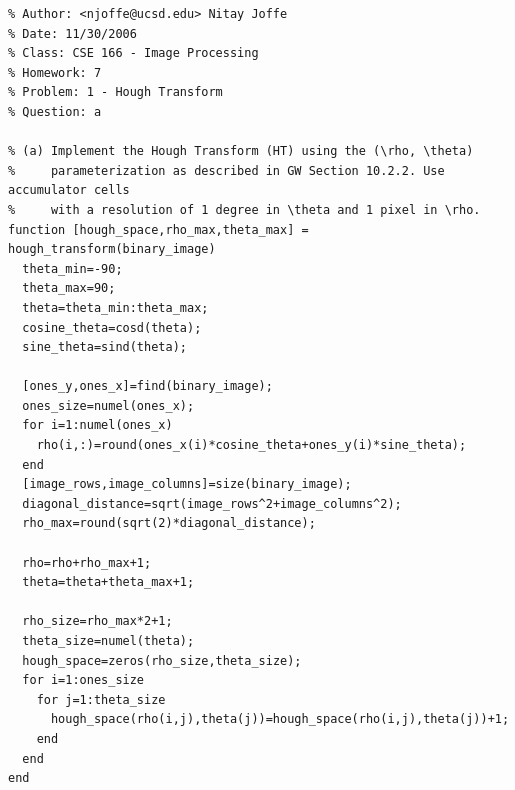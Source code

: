 \documentclass{article}
\begin{document}
\newpage
\begin{verbatim}
% Author: <njoffe@ucsd.edu> Nitay Joffe
% Date: 11/30/2006
% Class: CSE 166 - Image Processing
% Homework: 7
% Problem: 1 - Hough Transform
% Question: a

% (a) Implement the Hough Transform (HT) using the (\rho, \theta)
%     parameterization as described in GW Section 10.2.2. Use accumulator cells
%     with a resolution of 1 degree in \theta and 1 pixel in \rho.
function [hough_space,rho_max,theta_max] = hough_transform(binary_image)
  theta_min=-90;
  theta_max=90;
  theta=theta_min:theta_max;
  cosine_theta=cosd(theta);
  sine_theta=sind(theta);

  [ones_y,ones_x]=find(binary_image);
  ones_size=numel(ones_x);
  for i=1:numel(ones_x)
    rho(i,:)=round(ones_x(i)*cosine_theta+ones_y(i)*sine_theta);
  end
  [image_rows,image_columns]=size(binary_image);
  diagonal_distance=sqrt(image_rows^2+image_columns^2);
  rho_max=round(sqrt(2)*diagonal_distance);

  rho=rho+rho_max+1;
  theta=theta+theta_max+1;

  rho_size=rho_max*2+1;
  theta_size=numel(theta);
  hough_space=zeros(rho_size,theta_size);
  for i=1:ones_size
    for j=1:theta_size
      hough_space(rho(i,j),theta(j))=hough_space(rho(i,j),theta(j))+1;
    end
  end
end
\end{verbatim}
\newpage
\end{document}
